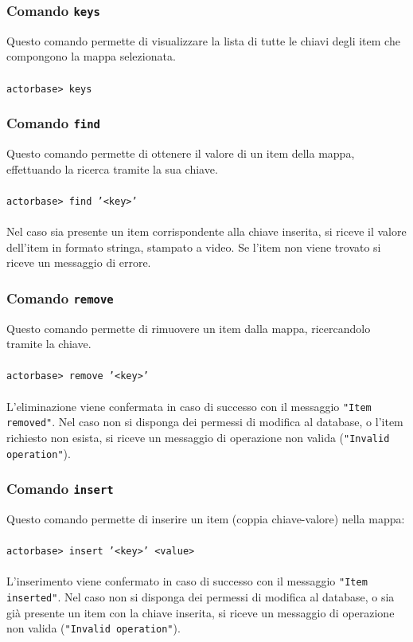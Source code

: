 \documentclass[a4paper]{article}
\begin{document}
	\subsubsection{Comando \texttt{keys}}
	Questo comando permette di visualizzare la lista di tutte le chiavi degli item che compongono la mappa selezionata.
	\\ \\
	\texttt{actorbase>	keys}

	\subsubsection{Comando \texttt{find}}
	Questo comando permette di ottenere il valore di un item della mappa, effettuando la ricerca tramite la sua chiave.
	\\ \\
	\texttt{actorbase>	find '<key>'}
	\\ \\
	Nel caso sia presente un item corrispondente alla chiave inserita, si riceve il valore dell'item in formato stringa, stampato a video. Se l'item non viene trovato si riceve un messaggio di errore.
	\subsubsection{Comando \texttt{remove}}
	Questo comando permette di rimuovere un item dalla mappa, ricercandolo tramite la chiave.
	\\ \\
	\texttt{actorbase>	remove '<key>'}
	\\ \\
	L'eliminazione viene confermata in caso di successo con il messaggio \texttt{"Item removed"}. Nel caso non si disponga dei permessi di modifica al database, o l'item 
	richiesto non esista, si riceve un messaggio di operazione non valida (\texttt{"Invalid operation"}).

	\subsubsection{Comando \texttt{insert}}
	Questo comando permette di inserire un item (coppia chiave-valore) nella mappa:
	\\ \\
	\texttt{actorbase>	insert '<key>' <value>}
	\\ \\
	L'inserimento viene confermato in caso di successo con il messaggio \texttt{"Item inserted"}. Nel caso non si disponga dei permessi di modifica al database, o sia già presente un item con la chiave inserita, si riceve un messaggio di operazione non valida (\texttt{"Invalid operation"}).
	
\end{document}
